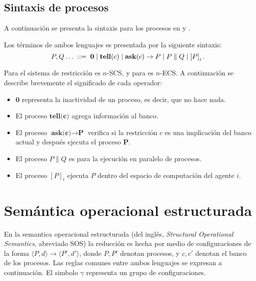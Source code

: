 \subsection{Sintaxis de procesos}
\label{spr.sccp}

A continuaci\'on se presenta la sintaxis para los procesos en \textbf{\SCCP} y \textbf{\ECCP}.

\theoremstyle{definition}
\begin{definition}\label{def:gensyn}
Los t\'erminos de ambos lenguajes es presentada por la siguiente sintaxis: \[P,Q\ldots \; ::= \;\Stop\mid \tell(c) \mid \ask(c)\rightarrow P \mid P \parallel Q  \mid \K i P.\]
\end{definition}

Para \textbf{\SCCP} el sistema de restricci\'on es $n$-SCS, y para \textbf{\ECCP} es $n$-ECS. A continuaci\'on se describe brevemente el significado de cada operador:

\begin{itemize}
	\item $\textbf{0}$ representa la inactividad de un proceso, es decir, que no hace nada.
	\item El proceso $\textbf{tell(c)}$ agrega informaci\'on al banco.
	\item El proceso $\textbf{ask(c)} \rightarrow \textbf{P}$ verifica si la restricci\'on $c$ es una implicaci\'on del banco actual y 	despu\'es ejecuta el proceso $\textbf{P}$.
	\item El proceso $P\parallel Q$ es para la ejecuci\'on en paralelo de procesos.
	\item El proceso $[P]_i$ ejecuta $P$ dentro del espacio de computaci\'on del agente $i$.
\end{itemize}


\section{Sem\'antica operacional estructurada}
\label{soe.sccp}

En la semantica operacional estructurada (del ingl\'es, \textit{Structural Operational Semantics}, abreviado SOS) 
la reducci\'on es hecha por medio de configuraciones de la forma $\langle P,d\rangle \rightarrow \langle P',d'\rangle$, donde $P,P'$ denotan procesos, y $c,c'$ denotan el banco de los procesos. Las reglas comunes entre ambos lenguajes se expresan a continuaci\'on. El simbolo $\gamma$ representa un grupo de configuraciones.

